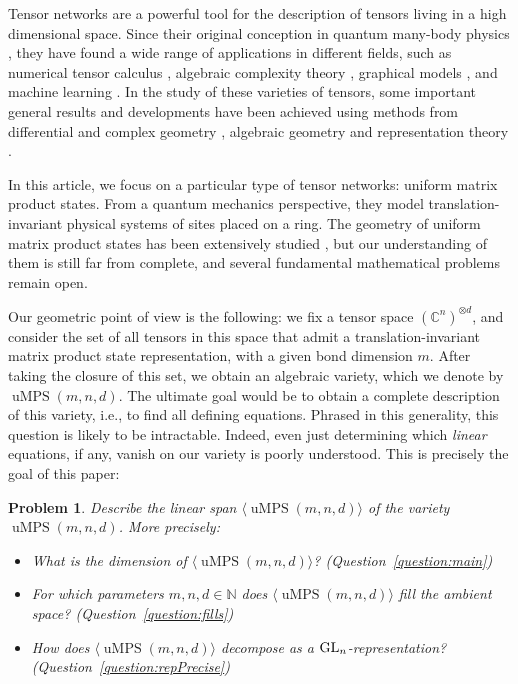 \documentclass[pdftex]{sigma}
\numberwithin{equation}{section}
\newtheorem{problem}[Theorem]{Problem}
\newcommand{\CC}{\mathbb{C}}
\newcommand{\ot}{\otimes}
\DeclareMathOperator{\uMPS}{uMPS}
\begin{document}
Tensor networks are a powerful tool for the description of tensors living in a high dimensional space. Since their original conception in quantum many-body physics  \cite{AffKenLieTas:ValenceBondGroundStates,fannes1992finitely,OstRom:ThermoLimitDensityMatrixRenorm}, they have found a wide range of applications in different fields, such as numerical tensor calculus \cite{bachmayr2016tensor,cichocki2016tensor,hackbuschTensorSpaces, oseledets2011tensor}, algebraic complexity theory \cite{DvMaPeYe:Multi_Branching_Programs}, %
graphical models \cite{robevaSeigal}, and machine learning \cite{chen2018equivalence, cichocki2016tensor}.
In the study of these varieties of tensors, some important general results and developments have been achieved using methods from differential and complex geometry \cite{haegeman2014geometry}, algebraic geometry and representation theory \cite{barthel2022closedness,bernardi2022dimension,BucBucMic:HackbushConjecture,ChrGesStWer:Optimization,ChrLucVraWer:TensorNetworkRepGeom,hackl2020geometry, landsbergQiYe}.

In this article, we focus on a particular type of tensor networks: uniform matrix product states. From a quantum mechanics perspective, they model translation-invariant physical systems of sites placed on a ring. The geometry of uniform matrix product states has been extensively studied \cite{Critch2014AlgebraicGO,Czaplinski2019UniformMP,haegeman2014geometry, PerezGarciaVerstraeteMPS}, but our understanding of them is still far from complete, and several fundamental mathematical problems remain open.

Our geometric point of view is the following: we fix a tensor space $(\CC^n)^{\ot d}$, and consider the set of all tensors in this space that admit a translation-invariant matrix product state representation, with a given bond dimension $m$. After taking the closure of this set, we obtain an algebraic variety, which we denote by $\uMPS(m,n,d)$.
The ultimate goal would be to obtain a complete description of this variety, i.e., to find all defining equations. Phrased in this generality, this question is likely to be intractable. Indeed, even just determining which \emph{linear} equations, if any, vanish on our variety is poorly understood. This is precisely the goal of this paper:

\begin{problem} \label{problem: linSpanUMPS}
Describe the linear span $\langle\uMPS(m,n,d)\rangle$ of the variety $\uMPS(m,n,d)$. More precisely:
\begin{itemize}\itemsep=0pt
    \item What is the dimension of $\langle\uMPS(m,n,d)\rangle$? {\rm (}Question~{\rm \ref{question:main})}
     \item For which parameters $m,n,d \in \mathbb{N}$ does $\langle\uMPS(m,n,d)\rangle$ fill the ambient space? {\rm (}Question~{\rm \ref{question:fills})}
    \item How does $\langle\uMPS(m,n,d)\rangle$ decompose as a ${\rm GL}_n$-representation? {\rm (}Question~{\rm \ref{question:repPrecise})}
\end{itemize}
\end{problem}
\end{document}

